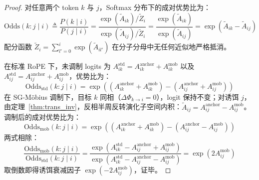 \documentclass[11pt,a4paper]{article}
\theoremstyle{definition}
\begin{document}
\begin{proof}
对任意两个 token $k$ 与 $j$，Softmax 分布下的成对优势比为：
\begin{equation}
\mathrm{Odds}(k : j \mid i) \triangleq \frac{P(k \mid i)}{P(j \mid i)} = \frac{\exp(\tilde{A}_{ik}) / \tilde{Z}_i}{\exp(\tilde{A}_{ij}) / \tilde{Z}_i} = \frac{\exp(\tilde{A}_{ik})}{\exp(\tilde{A}_{ij})} = \exp(\tilde{A}_{ik} - \tilde{A}_{ij})
\end{equation}
配分函数 $\tilde{Z}_i = \sum_{l'=0}^i \exp(\tilde{A}_{il'})$ 在分子分母中无任何近似地严格抵消。

在标准 RoPE 下，未调制 logits 为 $A_{ik}^{\text{std}} = A_{ik}^{\text{anchor}} + A_{ik}^{\text{mob}}$ 以及 $A_{ij}^{\text{std}} = A_{ij}^{\text{anchor}} + A_{ij}^{\text{mob}}$，优势比为：
\begin{equation}
\mathrm{Odds}_{\text{std}}(k : j \mid i) = \exp\left( (A_{ik}^{\text{anchor}} + A_{ik}^{\text{mob}}) - (A_{ij}^{\text{anchor}} + A_{ij}^{\text{mob}}) \right)
\end{equation}
在 SG-M\"obius 调制下，目标 $k$ 同相（$\Delta\Phi_{k \to i} = 0$），logit 保持不变；对诱饵 $j$，由定理~\ref{thm:trans_inv}，反相半周反转演化子空间内积：$\tilde{A}_{ij} = A_{ij}^{\text{anchor}} - A_{ij}^{\text{mob}}$。调制后的成对优势比为：
\begin{equation}
\mathrm{Odds}_{\mathrm{mob}}(k : j \mid i) = \exp\left( (A_{ik}^{\text{anchor}} + A_{ik}^{\text{mob}}) - (A_{ij}^{\text{anchor}} - A_{ij}^{\text{mob}}) \right)
\end{equation}
两式相除：
\begin{equation}
\frac{\mathrm{Odds}_{\mathrm{mob}}(k : j \mid i)}{\mathrm{Odds}_{\mathrm{std}}(k : j \mid i)} = \frac{\exp(A_{ik}^{\text{std}} - A_{ij}^{\text{anchor}} + A_{ij}^{\text{mob}})}{\exp(A_{ik}^{\text{std}} - A_{ij}^{\text{anchor}} - A_{ij}^{\text{mob}})} = \exp\left( 2 A_{ij}^{\text{mob}} \right)
\end{equation}
取倒数即得诱饵衰减因子 $\exp(-2 A_{ij}^{\text{mob}})$，证毕。
\end{proof}
\end{document}
